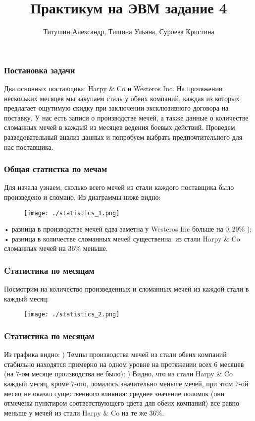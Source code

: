 \documentclass[12pt,pdf,hyperref={unicode}]{beamer}
\title{Практикум на ЭВМ задание 4}
\author{Титушин Александр, Тишина Ульяна, Суроева Кристина}
\institute{группа 311}
\begin{document}
\newcommand\Rn{\R^n}

\frame{\maketitle}


\begin{frame}\frametitle{Постановка задачи}
Два основных поставщика: Harpy \& Co и Westeros Inc.
На протяжении нескольких месяцев мы закупаем сталь у обеих
компаний, каждая из которых предлагает ощутимую скидку при
заключении эксклюзивного договора на поставку.
У нас есть записи о производстве мечей, а также данные о
количестве сломанных мечей в каждый из месяцев ведения
боевых действий.
Проведем разведовательный анализ данных и попробуем
выбрать предпочтительного для нас поставщика.
	
\end{frame}

\begin{frame}\frametitle{Общая статистка по мечам}
Для начала узнаем, сколько всего мечей из стали каждого
поставщика было произведено и сломано.
Из диаграммы ниже видно:
\begin{figure}
		\texttt{[image: ./statistics\_1.png]}
\end{figure}
• разница в производстве мечей едва заметна у Westeros Inc больше на
$0,29\% $ ); \newline • разница в количестве сломанных мечей существенна: из
стали Harpy \& Co сломанных мечей на $36\%$ меньше.
\end{frame}

\begin{frame}\frametitle{Cтатистика по месяцам}
Посмотрим на количество произведенных и сломанных мечей
из каждой стали в каждый месяц:
\begin{figure}
		\texttt{[image: ./statistics\_2.png]}
\end{figure}
\end{frame}

\begin{frame}\frametitle{Cтатистика по месяцам}
Из графика видно: \newline 
{}) Темпы производства мечей из стали обеих компаний
стабильно находятся примерно на одном уровне на
протяжении всех 6 месяцев (на 7-ом месяце
производства не было);
\newline 
{}) Видно, что из стали Harpy \& Co каждый месяц, кроме
7-ого, ломалось значительно меньше мечей, при этом
7-ой месяц не оказал существенного влияния: среднее
значение поломок (они отмечены пунктиром
соответствующего цвета для обеих компаний) все равно
меньше у мечей из стали Harpy \& Co на те же 36\%.
\end{frame}
\end{document}
